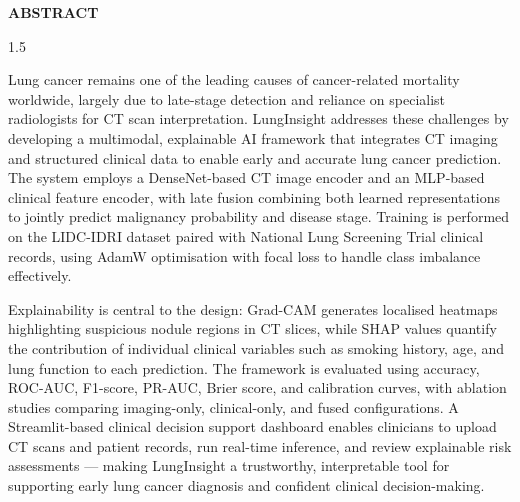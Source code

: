 \begin{center}\vspace{1.5in}
\bfseries\LARGE{ABSTRACT} \\
\end{center}\vspace{0.2in}

\normalsize{\begin{spacing}{1.5}
\noindent

Lung cancer remains one of the leading causes of cancer-related mortality worldwide, largely due to late-stage detection and reliance on specialist radiologists for CT scan interpretation. LungInsight addresses these challenges by developing a multimodal, explainable AI framework that integrates CT imaging and structured clinical data to enable early and accurate lung cancer prediction. The system employs a DenseNet-based CT image encoder and an MLP-based clinical feature encoder, with late fusion combining both learned representations to jointly predict malignancy probability and disease stage. Training is performed on the LIDC-IDRI dataset paired with National Lung Screening Trial clinical records, using AdamW optimisation with focal loss to handle class imbalance effectively.

Explainability is central to the design: Grad-CAM generates localised heatmaps highlighting suspicious nodule regions in CT slices, while SHAP values quantify the contribution of individual clinical variables such as smoking history, age, and lung function to each prediction. The framework is evaluated using accuracy, ROC-AUC, F1-score, PR-AUC, Brier score, and calibration curves, with ablation studies comparing imaging-only, clinical-only, and fused configurations. A Streamlit-based clinical decision support dashboard enables clinicians to upload CT scans and patient records, run real-time inference, and review explainable risk assessments — making LungInsight a trustworthy, interpretable tool for supporting early lung cancer diagnosis and confident clinical decision-making.
 
\end{spacing}}
	
